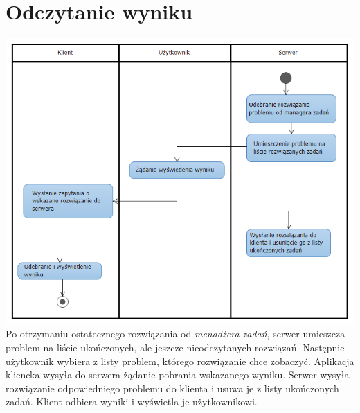 \documentclass[12pt,a4paper,titlepage]{report}
\begin{document}
		\section{Odczytanie wyniku}
		\includegraphics[width=\textwidth]{img/diagram2.png}
		Po otrzymaniu ostatecznego rozwiązania od \textit{menadżera zadań}, serwer umieszcza problem na liście ukończonych, ale jeszcze nieodczytanych rozwiązań. Następnie użytkownik wybiera z listy problem, którego rozwiązanie chce zobaczyć. Aplikacja kliencka wysyła do serwera żądanie pobrania wskazanego wyniku. Serwer wysyła rozwiązanie odpowiedniego problemu do klienta i usuwa je z listy ukończonych zadań. Klient odbiera wyniki i wyświetla je użytkownikowi.
		
\end{document}
